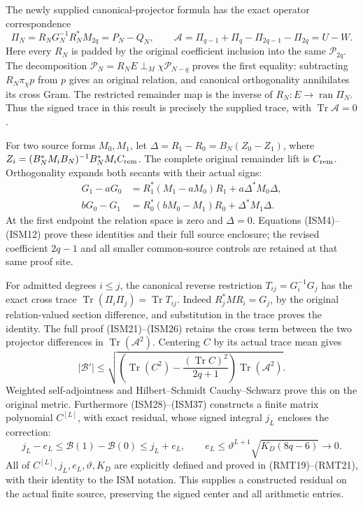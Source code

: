 The newly supplied canonical-projector formula has the exact
operator correspondence
\[
 \Pi_N=R_NG_N^{-1}R_N^*M_{2q}=P_N-Q_N,\qquad
 \mathcal A=\Pi_{q-1}+\Pi_q-\Pi_{2q-1}-\Pi_{2q}=U-W .
\]
Here every \(R_N\) is padded by the original coefficient
inclusion into the same \(\mathcal P_{2q}\).  The decomposition
\(\mathcal P_N=R_NE\perp_M\chi\mathcal P_{N-q}\) proves the
first equality: subtracting \(R_N\pi_\chi p\) from \(p\)
gives an original relation, and canonical orthogonality
annihilates its cross Gram.  The restricted remainder map
is the inverse of \(R_N:E\to\operatorname{ran}\Pi_N\).
Thus the signed trace in this result is precisely the
supplied trace, with \(\operatorname{Tr}\mathcal A=0\).

For two source forms \(M_0,M_1\), let
\(\Delta=R_1-R_0=B_N(Z_0-Z_1)\), where
\(Z_i=(B_N^*M_iB_N)^{-1}B_N^*M_iC_{\rm rem}\).
The complete original remainder lift is \(C_{\rm rem}\).
Orthogonality expands both secants with their actual signs:
\[
 \begin{split}
 G_1-aG_0&=R_1^*(M_1-aM_0)R_1+a\Delta^*M_0\Delta,\\
 bG_0-G_1&=R_0^*(bM_0-M_1)R_0+\Delta^*M_1\Delta.
 \end{split}
\]
At the first endpoint the relation space is zero and
\(\Delta=0\).  Equations (ISM4)--(ISM12) prove these
identities and their full source enclosure; the revised
coefficient \(2q-1\) and all smaller common-source controls
are retained at that same proof site.

For admitted degrees \(i\leq j\), the canonical reverse
restriction \(T_{ij}=G_i^{-1}G_j\)
has the exact cross trace
\(\operatorname{Tr}(\Pi_i\Pi_j)=\operatorname{Tr}T_{ij}\).
Indeed \(R_j^*MR_i=G_j\), by the original relation-valued
section difference, and substitution in the trace proves
the identity.  The full proof (ISM21)--(ISM26) retains the
cross term between the two projector differences in
\(\operatorname{Tr}(\mathcal A^2)\).  Centering \(C\) by
its actual trace mean gives
\[
 |\mathcal B'|\leq
 \sqrt{\left(\operatorname{Tr}(C^2)
        -\frac{(\operatorname{Tr}C)^2}{2q+1}\right)
                      \operatorname{Tr}(\mathcal A^2)} .
\]
Weighted self-adjointness and Hilbert--Schmidt
Cauchy--Schwarz prove this on the original metric.
Furthermore (ISM28)--(ISM37) constructs a finite
matrix polynomial \(C^{[L]}\), with exact residual,
whose signed integral \(j_L\) encloses the correction:
\[
 j_L-e_L\leq\mathcal B(1)-\mathcal B(0)\leq j_L+e_L,
 \qquad
 e_L\leq\vartheta^{L+1}\sqrt{K_D(8q-6)}\longrightarrow0.
\]
All of \(C^{[L]},j_L,e_L,\vartheta,K_D\) are explicitly
defined and proved in (RMT19)--(RMT21), with their
identity to the ISM notation.  This supplies a constructed
residual on the actual finite source, preserving the
signed center and all arithmetic entries.

